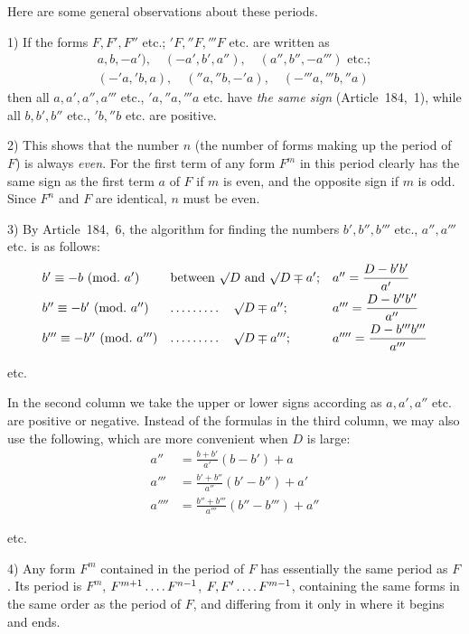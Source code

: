 Here are some general observations about these periods.

1) If the forms $F,F',F''$ etc.; ${}'F,{}''F,{}'''F$ etc. are written as
\[
\begin{gathered}
{a,b,-a')},\quad (-a',b',a''),\quad (a'',b'',-a''')\text{ etc.};\\
(-{}'a,{}'b,a),\quad ({}''a,{}''b,-{}'a),\quad (-{}'''a,{}'''b,{}''a)
\end{gathered}
\]
then all $a,a',a'',a'''$ etc., ${}'a,{}''a,{}'''a$ etc. have \textit{the same sign} (Article~184,~1), while all $b,b',b''$ etc., ${}'b,{}''b$ etc. are positive.

2) This shows that the number $n$ (the number of forms making up the period of $F$) is always \textit{even}. For the first term of any form $F^m$ in this period clearly has the same sign as the first term $a$ of $F$ if $m$ is even, and the opposite sign if $m$ is odd. Since $F^n$ and $F$ are identical, $n$ must be even.

3) By Article~184,~6, the algorithm for finding the numbers $b',b'',b'''$ etc., $a'',a'''$ etc. is as follows:
\[
\begin{array}{lll}
b'\equiv-b\ (\mathrm{mod.}\ a')&\text{between }\surd D\text{ and }\surd D\mp a';&a''=\dfrac{D-b'b'}{a'}\\[6pt]
b''\equiv-b'\ (\mathrm{mod.}\ a'')&\mathinner{\ldotp\ldotp\ldotp\ldotp\ldotp\ldotp\ldotp\ldotp\ldotp}\quad\surd D\mp a'';&a'''=\dfrac{D-b''b''}{a''}\\[6pt]
b'''\equiv-b''\ (\mathrm{mod.}\ a''')&\mathinner{\ldotp\ldotp\ldotp\ldotp\ldotp\ldotp\ldotp\ldotp\ldotp}\quad\surd D\mp a''';&a''''=\dfrac{D-b'''b'''}{a'''}
\end{array}
\]
\centerline{etc.}
In the second column we take the upper or lower signs according as $a,a',a''$ etc. are positive or negative. Instead of the formulas in the third column, we may also use the following, which are more convenient when $D$ is large:
\[
\begin{aligned}
a''&=\frac{b+b'}{a'}(b-b')+a\\
a'''&=\frac{b'+b''}{a''}(b'-b'')+a'\\
a''''&=\frac{b''+b'''}{a'''}({b''}-b''')+a''
\end{aligned}
\]
\centerline{etc.}

4) Any form $F^m$ contained in the period of $F$ has essentially the same period as $F$. Its period is $F^m$, $F^{m+1}\mathinner{\ldotp\ldotp\ldotp\ldotp} F^{n-1}$, $F,F'\mathinner{\ldotp\ldotp\ldotp\ldotp} F^{m-1}$, containing the same forms in the same order as the period of $F$, and differing from it only in where it begins and ends.

